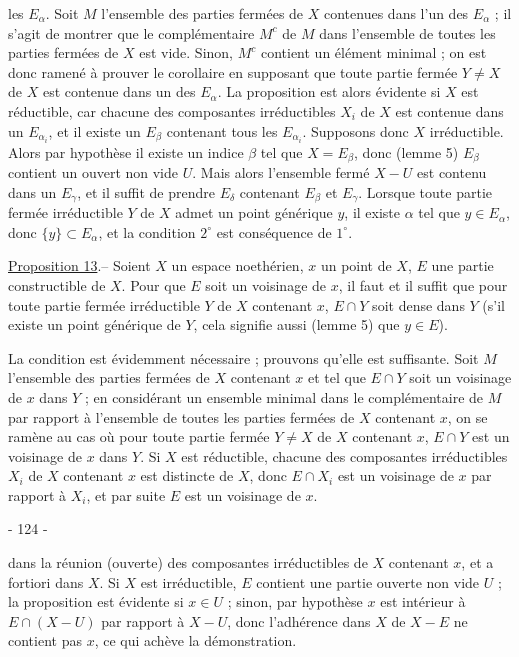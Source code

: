 les $E_{\alpha}$. Soit $M$ l'ensemble des parties fermées de $X$ contenues dans l'un des $E_{\alpha}$ ; il s'agit de montrer que le complémentaire $M^c$ de $M$ dans l'ensemble de toutes les parties fermées de $X$ est vide. Sinon, $M^c$ contient un élément minimal ; on est donc ramené à prouver le corollaire en supposant que toute partie fermée $Y \neq X$ de $X$ est contenue dans un des $E_{\alpha}$. La proposition est alors évidente si $X$ est réductible, car chacune des composantes irréductibles $X_i$ de $X$ est contenue dans un $E_{\alpha_i}$, et il existe un $E_\beta$ contenant tous les $E_{\alpha_i}$. Supposons donc $X$ irréductible. Alors par hypothèse il existe un indice $\beta$ tel que $X = E_{\beta}$, donc (lemme 5) $E_{\beta}$ contient un ouvert non vide $U$. Mais alors l'ensemble fermé $X-U$ est contenu dans un $E_{\gamma}$, et il suffit de prendre $E_{\delta}$ contenant $E_{\beta}$ et $E_{\gamma}$. Lorsque toute partie fermée irréductible $Y$ de $X$ admet un point générique $y$, il existe $\alpha$ tel que $y \in E_{\alpha}$, donc $\{y\} \subset E_{\alpha}$, et la condition $2^{\circ}$ est conséquence de $1^{\circ}$.

\underline{Proposition 13}.-- Soient $X$ un espace noethérien, $x$ un point de $X$, $E$ une partie constructible de $X$. Pour que $E$ soit un voisinage de $x$, il faut et il suffit que pour toute partie fermée irréductible $Y$ de $X$ contenant $x$, $E \cap Y$ soit dense dans $Y$ (s'il existe un point générique de $Y$, cela signifie aussi (lemme 5) que $y \in E$).

La condition est évidemment nécessaire ; prouvons qu'elle est suffisante. Soit $M$ l'ensemble des parties fermées de $X$ contenant $x$ et tel que $E \cap Y$ soit un voisinage de $x$ dans $Y$ ; en considérant un ensemble minimal dans le complémentaire de $M$ par rapport à l'ensemble de toutes les parties fermées de $X$ contenant $x$, on se ramène au cas où pour toute partie fermée $Y \neq X$ de $X$ contenant $x$, $E \cap Y$ est un voisinage de $x$ dans $Y$. Si $X$ est réductible, chacune des composantes irréductibles $X_i$ de $X$ contenant $x$ est distincte de $X$, donc $E \cap X_i$ est un voisinage de $x$ par rapport à $X_i$, et par suite $E$ est un voisinage de $x$.

\newpage


- 124 -

dans la réunion (ouverte) des composantes irréductibles de $X$ contenant $x$, et a fortiori dans $X$. Si $X$ est irréductible, $E$ contient une partie ouverte non vide $U$ ; la proposition est évidente si $x \in U$ ; sinon, par hypothèse $x$ est intérieur à $E \cap (X-U)$ par rapport à $X-U$, donc l'adhérence dans $X$ de $X-E$ ne contient pas $x$, ce qui achève la démonstration.

